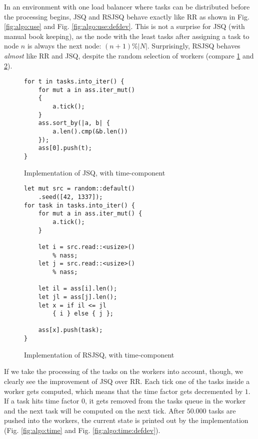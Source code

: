 In an environment with one load balancer where tasks can be distributed before
the processing begins, \ac{JSQ} and \ac{RSJSQ} behave exactly like \ac{RR} as
shown in Fig. \ref{fig:algo:use} and Fig. \ref{fig:algo:use:defdev}.
This is not a surprise for \ac{JSQ} (with manual book keeping), as the node with
the least tasks after assigning a task to node $n$ is always the next node:
$(n + 1) \% |N|$.
Surprisingly, \ac{RSJSQ} behaves \emph{almost} like \ac{RR} and \ac{JSQ},
despite the random selection of workers
(compare \ref{lst:jsq} and \ref{lst:rsjsq}).

\begin{figure}[]
    \begin{lstlisting}
for t in tasks.into_iter() {
    for mut a in ass.iter_mut()
    {
        a.tick();
    }
    ass.sort_by(|a, b| {
        a.len().cmp(&b.len())
    });
    ass[0].push(t);
}
    \end{lstlisting}
    \caption{Implementation of \ac{JSQ}, with time-component}
    \label{lst:jsq}
\end{figure}

\begin{figure}[b!]
    \begin{lstlisting}
let mut src = random::default()
    .seed([42, 1337]);
for task in tasks.into_iter() {
    for mut a in ass.iter_mut() {
        a.tick();
    }

    let i = src.read::<usize>()
        % nass;
    let j = src.read::<usize>()
        % nass;

    let il = ass[i].len();
    let jl = ass[j].len();
    let x = if il <= jl
        { i } else { j };

    ass[x].push(task);
}
    \end{lstlisting}
    \caption{Implementation of \ac{RSJSQ}, with time-component}
    \label{lst:rsjsq}
\end{figure}

If we take the processing of the tasks on the workers into account, though, we
clearly see the improvement of \ac{JSQ} over \ac{RR}.
Each tick one of the tasks inside a worker gets computed, which means that
the time factor gets decremented by $1$.
If a task hits time factor $0$, it gets removed from the tasks queue in the
worker and the next task will be computed on the next tick.
After $50.000$ tasks are pushed into the workers, the current state is printed
out by the implementation (Fig. \ref{fig:algo:time} and
Fig. \ref{fig:algo:time:defdev}).

